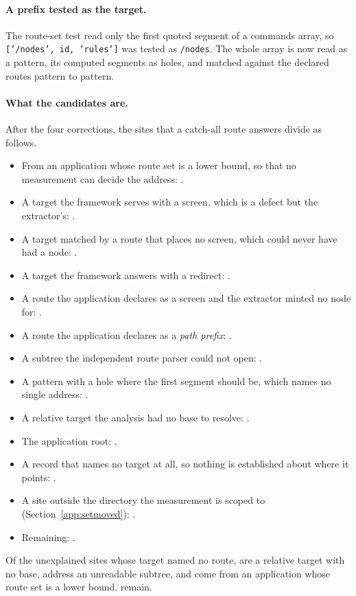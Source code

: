 \paragraph{A prefix tested as the target.} The route-set test read only the first quoted segment of a commands array, so \texttt{['/nodes', id, 'rules']} was tested as \texttt{/nodes}. The whole array is now read as a pattern, its computed segments as holes, and matched against the declared routes pattern to pattern.

\paragraph{What the candidates are.} After the four corrections, the \RoundTwoWildcardRescued{} sites that a catch-all route answers divide as follows.
\begin{itemize}
\item From an application whose route set is a lower bound, so that no measurement can decide the address: \RoundTwoWildcardCaveated{}.
\item A target the framework serves with a screen, which is a defect but the extractor's: \RoundTwoFrameworkMountsIt{}.
\item A target matched by a route that places no screen, which could never have had a node: \RoundTwoFrameworkPrefix{}.
\item A target the framework answers with a redirect: \RoundTwoFrameworkRedirects{}.
\item A route the application declares as a screen and the extractor minted no node for: \RoundTwoWildcardNoNode{}.
\item A route the application declares as a \emph{path prefix}: \RoundTwoWildcardPrefix{}.
\item A subtree the independent route parser could not open: \RoundTwoWildcardBlind{}.
\item A pattern with a hole where the first segment should be, which names no single address: \RoundTwoWildcardPattern{}.
\item A relative target the analysis had no base to resolve: \RoundTwoWildcardRelative{}.
\item The application root: \RoundTwoWildcardAppRoot{}.
\item A record that names no target at all, so nothing is established about where it points: \RoundTwoWildcardNoTarget{}.
\item A site outside the directory the measurement is scoped to (Section~\ref{app:setmoved}): \RoundTwoOutsideDirSites{}.
\item Remaining: \RoundTwoDeadLinkWildcarded{}.
\end{itemize}
Of the \RoundTwoTargetNoRoute{} unexplained sites whose target named no route, \RoundTwoRelativeUnresolved{} are a relative target with no base, \RoundTwoUnderUnreadable{} address an unreadable subtree, and \RoundTwoNoRouteCaveated{} come from an application whose route set is a lower bound. \RoundTwoDeadLinkUnanswered{} remain.

